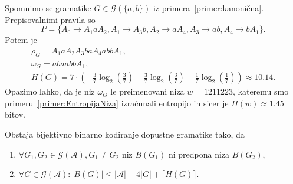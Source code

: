\documentclass[fin1, tisk]{fmfdelo}
\providecommand{\abs}[1]{\left\lvert #1 \right\rvert}
\newcommand{\A}{\mathcal{A}}
\newcommand{\G}{\mathcal{G}}
\theoremstyle{definition}
\begin{document}
\begin{primer}\label{primer:EntropijaGramatike}
    Spomnimo se gramatike $G \in \G(\{ a,b \})$ iz primera~\ref{primer:kanonična}. Prepisovalnimi
    pravila so
    \[
        P = \{ A_0 \rightarrow A_1aA_2, A_1 \rightarrow A_3b, A_2 \rightarrow aA_4,
        A_3 \rightarrow ab, A_4 \rightarrow bA_1 \}.
    \]
    Potem je 
    \begin{gather*}
        \rho_G = A_1aA_2A_3baA_4abbA_1, \\
        \omega_G = abaabbA_1, \\
        H(G) = 7 \cdot 
        \left(
        - \frac{3}{7} \log_2 \left( \frac{3}{7} \right) 
        - \frac{3}{7} \log_2 \left( \frac{3}{7} \right)
        - \frac{1}{7} \log_2 \left( \frac{1}{7} \right)
        \right)
        \approx 10.14.
    \end{gather*}
    Opazimo lahko, da je niz $\omega_G$ le preimenovani niza $w = 1211223$, kateremu smo
    primeru~\ref{primer:EntropijaNiza} izračunali entropijo in sicer je 
    $H(w) \approx 1.45$ bitov.
\end{primer}

\begin{izrek}\label{izrek:BinarnoKodiranje}
    Obstaja bijektivno binarno kodiranje dopustne gramatike tako, da
    \begin{enumerate}
        \item $ \forall G_1, G_2 \in \G(\A), G_1 \neq G_2 $ niz $B(G_1)$ ni predpona niza $B(G_2)$,
        \item $ \forall G \in \G(\A) \colon \abs{B(G)} \leq \abs{\A} + 4 \abs{G} + \lceil H(G) \rceil$.
    \end{enumerate}
\end{izrek}
\end{document}
